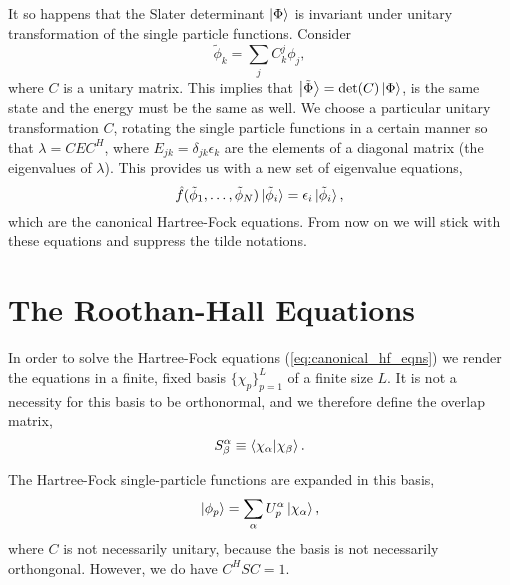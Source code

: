 It so happens that the Slater determinant $\ket{\Phi}$ is invariant under unitary
transformation of the single particle functions. Consider
\begin{equation}
    \tilde{\phi}_k = \sum_j C^j_k\phi_j ,
\end{equation}
where $C$ is a unitary matrix. This implies that $\ket{\tilde{\Phi}} = \det(C)\ket{\Phi}$,
is the same state and the energy must be the same as well. We choose a particular
unitary transformation $C$, rotating the single particle functions in a certain 
manner so that $\lambda = CEC^H$, where $E_{jk} = \delta_{jk}\epsilon_k$ are the 
elements of a diagonal matrix (the eigenvalues of $\lambda$). This provides us with 
a new set of eigenvalue equations,
\begin{equation}
    \label{eq:canonical_hf_eqns}
    \hat{f}(\tilde{\phi}_1, \dots, \tilde{\phi}_N)\ket*{\tilde{\phi}_i}
        = \epsilon_i \ket*{\tilde{\phi}_i},
\end{equation}
which are the canonical Hartree-Fock equations. From now on we will stick with these 
equations and suppress the tilde notations.

\section{The Roothan-Hall Equations}
\label{sec:roothan_hall_eqns}

In order to solve the Hartree-Fock equations (\autoref{eq:canonical_hf_eqns}) we 
render the equations in a finite, fixed basis $\{\chi_p \}_{p=1}^L$ of a finite 
size $L$. It is not a necessity for this basis to be orthonormal, and we therefore 
define the overlap matrix,
\begin{equation}
    S^\alpha_\beta \equiv \braket{\chi_\alpha}{\chi_\beta}.
\end{equation}

The Hartree-Fock single-particle functions are expanded in this basis,
\begin{equation}
    \label{eq:roothan_hall_exp}
    \ket{\phi_p} = \sum_\alpha U^\alpha_p \ket{\chi_\alpha},
\end{equation}
where $C$ is not necessarily unitary, because the basis is not necessarily 
orthongonal. However, we do have $C^HSC = 1$.

